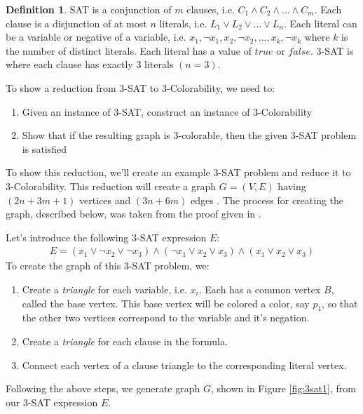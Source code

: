\documentclass{article}
\theoremstyle{definition}
\newtheorem{definition}{Definition}
\begin{document}
\begin{definition}\label{def:sat}
SAT is a conjunction of $m$ clauses, i.e. $C_1 \wedge C_2 \wedge \dots \wedge C_m$. Each clause is a disjunction of at most $n$ literals, i.e. $L_1 \vee L_2 \vee \dots \vee L_n$. Each literal can be a variable or negative of a variable, i.e. $x_1, \neg x_1, x_2, \neg x_2, \dots , x_k, \neg x_k$ where $k$ is the number of distinct literals. Each literal has a value of $true$ or $false$. 3-SAT is where each clause has exactly 3 literals \((n = 3)\).
\end{definition}

To show a reduction from 3-SAT to 3-Colorability, we need to:

\begin{enumerate}
\item Given an instance of 3-SAT, construct an instance of 3-Colorability
\item Show that if the resulting graph is 3-colorable, then the given 3-SAT problem is satisfied
\end{enumerate}

To show this reduction, we'll create an example 3-SAT problem and reduce it to 3-Colorability. This reduction will create a graph \(G = (V, E)\) having \((2n + 3m + 1)\) vertices and \((3n+6m)\) edges \cite{moret}. The process for creating the graph, described below, was taken from the proof given in \cite{sharma}.

Let's introduce the following 3-SAT expression $E$:
%
\begin{align*}
E = \left( x_1 \vee \neg x_2 \vee \neg x_3 \right) \wedge \left( \neg x_1 \vee x_2 \vee x_3 \right) \wedge \left( x_1 \vee x_2 \vee x_3 \right)
\end{align*}
%
To create the graph of this 3-SAT problem, we:
\begin{enumerate}
\item Create a \emph{triangle} for each variable, i.e. \(x_i\). Each has a common vertex \(B\), called the base vertex. This base vertex will be colored a color, say \(p_1\), so that the other two vertices correspond to the variable and it's negation.
\item Create a \emph{triangle} for each clause in the formula.
\item Connect each vertex of a clause triangle to the corresponding literal vertex.
\end{enumerate}

Following the above steps, we generate graph $G$, shown in Figure \ref{fig:3sat1}, from our 3-SAT expression $E$.
\end{document}
